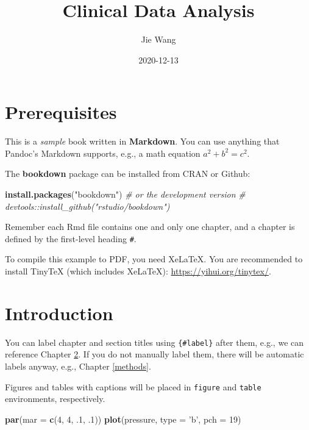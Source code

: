 \documentclass[
]{book}
\title{Clinical Data Analysis}
\author{Jie Wang}
\date{2020-12-13}
\newenvironment{Shaded}{\begin{snugshade}}{\end{snugshade}}
\newcommand{\CommentTok}[1]{\textcolor[rgb]{0.56,0.35,0.01}{\textit{#1}}}
\newcommand{\DataTypeTok}[1]{\textcolor[rgb]{0.13,0.29,0.53}{#1}}
\newcommand{\DecValTok}[1]{\textcolor[rgb]{0.00,0.00,0.81}{#1}}
\newcommand{\FloatTok}[1]{\textcolor[rgb]{0.00,0.00,0.81}{#1}}
\newcommand{\KeywordTok}[1]{\textcolor[rgb]{0.13,0.29,0.53}{\textbf{#1}}}
\newcommand{\NormalTok}[1]{#1}
\newcommand{\StringTok}[1]{\textcolor[rgb]{0.31,0.60,0.02}{#1}}
\begin{document}
\maketitle

{
\setcounter{tocdepth}{1}
\tableofcontents
}
\hypertarget{prerequisites}{%
\chapter{Prerequisites}\label{prerequisites}}

This is a \emph{sample} book written in \textbf{Markdown}. You can use anything that Pandoc's Markdown supports, e.g., a math equation \(a^2 + b^2 = c^2\).

The \textbf{bookdown} package can be installed from CRAN or Github:

\begin{Shaded}
\begin{Highlighting}[]
\KeywordTok{install.packages}\NormalTok{(}\StringTok{"bookdown"}\NormalTok{)}
\CommentTok{# or the development version}
\CommentTok{# devtools::install_github("rstudio/bookdown")}
\end{Highlighting}
\end{Shaded}

Remember each Rmd file contains one and only one chapter, and a chapter is defined by the first-level heading \texttt{\#}.

To compile this example to PDF, you need XeLaTeX. You are recommended to install TinyTeX (which includes XeLaTeX): \url{https://yihui.org/tinytex/}.

\hypertarget{intro}{%
\chapter{Introduction}\label{intro}}

You can label chapter and section titles using \texttt{\{\#label\}} after them, e.g., we can reference Chapter \ref{intro}. If you do not manually label them, there will be automatic labels anyway, e.g., Chapter \ref{methods}.

Figures and tables with captions will be placed in \texttt{figure} and \texttt{table} environments, respectively.

\begin{Shaded}
\begin{Highlighting}[]
\KeywordTok{par}\NormalTok{(}\DataTypeTok{mar =} \KeywordTok{c}\NormalTok{(}\DecValTok{4}\NormalTok{, }\DecValTok{4}\NormalTok{, }\FloatTok{.1}\NormalTok{, }\FloatTok{.1}\NormalTok{))}
\KeywordTok{plot}\NormalTok{(pressure, }\DataTypeTok{type =} \StringTok{'b'}\NormalTok{, }\DataTypeTok{pch =} \DecValTok{19}\NormalTok{)}
\end{Highlighting}
\end{Shaded}
\end{document}

